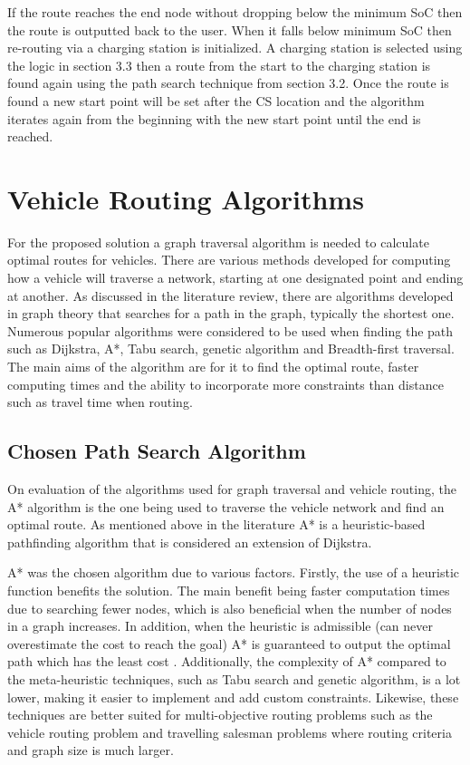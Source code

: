 \documentclass[11pt]{report}
\begin{document}
If the route reaches the end node without dropping below the minimum SoC then the route is outputted back to the user. When it falls below minimum SoC then re-routing via a charging station is initialized. A charging station is selected using the logic in section 3.3 then a route from the start to the charging station is found again using the path search technique from section 3.2. Once the route is found a new start point will be set after the CS location and the algorithm iterates again from the beginning with the new start point until the end is reached.

\section{Vehicle Routing Algorithms}

For the proposed solution a graph traversal algorithm is needed to calculate optimal routes for vehicles. There are various methods developed for computing how a vehicle will traverse a network, starting at one designated point and ending at another. As discussed in the literature review, there are algorithms developed in graph theory that searches for a path in the graph, typically the shortest one. Numerous popular algorithms were considered to be used when finding the path such as Dijkstra, A*, Tabu search, genetic algorithm and Breadth-first traversal. The main aims of the algorithm are for it to find the optimal route, faster computing times and the ability to incorporate more constraints than distance such as travel time when routing.

\subsection{Chosen Path Search Algorithm}

On evaluation of the algorithms used for graph traversal and vehicle routing, the A* algorithm is the one being used to traverse the vehicle network and find an optimal route. As mentioned above in the literature A* is a heuristic-based pathfinding algorithm that is considered an extension of Dijkstra. 

A* was the chosen algorithm due to various factors. Firstly, the use of a heuristic function benefits the solution. The main benefit being faster computation times due to searching fewer nodes, which is also beneficial when the number of nodes in a graph increases. In addition, when the heuristic is admissible (can never overestimate the cost to reach the goal) A* is guaranteed to output the optimal path which has the least cost \autocite{rana2011star}. Additionally, the complexity of A* compared to the meta-heuristic techniques, such as Tabu search and genetic algorithm, is a lot lower, making it easier to implement and add custom constraints. Likewise, these techniques are better suited for multi-objective routing problems such as the vehicle routing problem and travelling salesman problems where routing criteria and graph size is much larger. 
\end{document}
